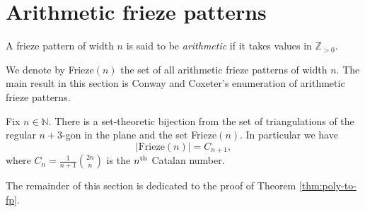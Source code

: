 \section{Arithmetic frieze patterns}
\begin{definition}
\label{def:arith-fp}
    A frieze pattern of width $n$ is said to be \textit{arithmetic} if it takes values in $\mathbb{Z}_{>0}$. 
\end{definition}

We denote by Frieze$(n)$ the set of all arithmetic frieze patterns of width $n$. The main result in this section 
is Conway and Coxeter's enumeration of arithmetic frieze patterns. 

\begin{theorem}
\label{thm:poly-to-fp}
    Fix $n \in \mathbb{N}$. There is a set-theoretic bijection from the set of triangulations of the regular $n+3$-gon in the plane
    and the set Frieze$(n)$. In particular we have
    \[
        |\text{Frieze}(n)| = C_{n+1},
    \]
    where $C_n = \frac{1}{n+1}\binom{2n}{n}$ is the $n^{\rm th}$ Catalan number.
\end{theorem}

The remainder of this section is dedicated to the proof of Theorem \ref{thm:poly-to-fp}. 

